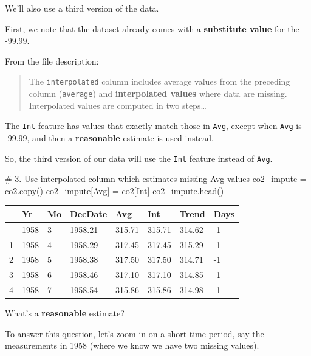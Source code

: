 \documentclass[
  letterpaper,
  DIV=11,
  numbers=noendperiod]{scrreprt}
\newenvironment{Shaded}{\begin{snugshade}}{\end{snugshade}}
\newcommand{\CommentTok}[1]{\textcolor[rgb]{0.37,0.37,0.37}{#1}}
\newcommand{\NormalTok}[1]{\textcolor[rgb]{0.00,0.23,0.31}{#1}}
\newcommand{\OperatorTok}[1]{\textcolor[rgb]{0.37,0.37,0.37}{#1}}
\newcommand{\StringTok}[1]{\textcolor[rgb]{0.13,0.47,0.30}{#1}}
\begin{document}
We'll also use a third version of the data.

First, we note that the dataset already comes with a \textbf{substitute
value} for the -99.99.

From the file description:

\begin{quote}
The \texttt{interpolated} column includes average values from the
preceding column (\texttt{average}) and \textbf{interpolated values}
where data are missing. Interpolated values are computed in two
steps\ldots{}
\end{quote}

The \texttt{Int} feature has values that exactly match those in
\texttt{Avg}, except when \texttt{Avg} is -99.99, and then a
\textbf{reasonable} estimate is used instead.

So, the third version of our data will use the \texttt{Int} feature
instead of \texttt{Avg}.

\begin{Shaded}
\begin{Highlighting}[]
\CommentTok{\# 3. Use interpolated column which estimates missing Avg values}
\NormalTok{co2\_impute }\OperatorTok{=}\NormalTok{ co2.copy()}
\NormalTok{co2\_impute[}\StringTok{\textquotesingle{}Avg\textquotesingle{}}\NormalTok{] }\OperatorTok{=}\NormalTok{ co2[}\StringTok{\textquotesingle{}Int\textquotesingle{}}\NormalTok{]}
\NormalTok{co2\_impute.head()}
\end{Highlighting}
\end{Shaded}

\begin{longtable}[]{@{}llllllll@{}}
\toprule\noalign{}
& Yr & Mo & DecDate & Avg & Int & Trend & Days \\
\midrule\noalign{}
\endhead
\bottomrule\noalign{}
\endlastfoot
0 & 1958 & 3 & 1958.21 & 315.71 & 315.71 & 314.62 & -1 \\
1 & 1958 & 4 & 1958.29 & 317.45 & 317.45 & 315.29 & -1 \\
2 & 1958 & 5 & 1958.38 & 317.50 & 317.50 & 314.71 & -1 \\
3 & 1958 & 6 & 1958.46 & 317.10 & 317.10 & 314.85 & -1 \\
4 & 1958 & 7 & 1958.54 & 315.86 & 315.86 & 314.98 & -1 \\
\end{longtable}

What's a \textbf{reasonable} estimate?

To answer this question, let's zoom in on a short time period, say the
measurements in 1958 (where we know we have two missing values).
\end{document}
